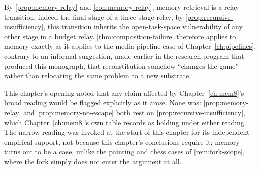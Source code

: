 \begin{proofsketch}
By \cref{prop:memory-relay} and \cref{con:memory-relay}, memory retrieval
is a relay transition, indeed the final stage of a three-stage relay; by
\cref{prop:recursive-insufficiency}, this transition inherits the
open-task-space vulnerability of any other stage in a budget relay.
\cref{thm:composition-failure} therefore applies to memory exactly as it
applies to the media-pipeline case of Chapter~\ref{ch:pipelines},
contrary to an informal suggestion, made earlier in the research program
that produced this monograph, that reconstitution somehow ``changes the
game'' rather than relocating the same problem to a new substrate.
\end{proofsketch}

This chapter's opening noted that any claim affected by
Chapter~\ref{ch:mem8}'s broad reading would be flagged explicitly as it
arose. None was: \cref{prop:memory-relay} and
\cref{prop:memory-no-escape} both rest on \cref{prop:recursive-insufficiency},
which Chapter~\ref{ch:mem8}'s own table records as holding under either
reading. The narrow reading was invoked at the start of this chapter for
its independent empirical support, not because this chapter's
conclusions require it; memory turns out to be a case, unlike the
painting and chess cases of \cref{rem:fork-scope}, where the fork simply
does not enter the argument at all.
